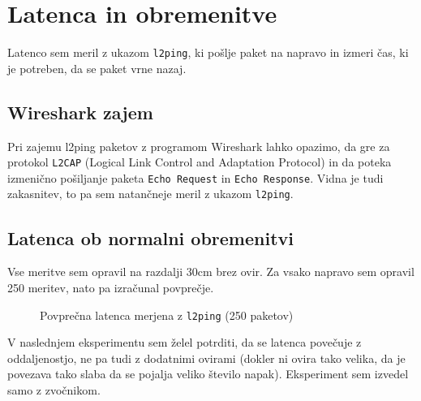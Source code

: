 \documentclass[11pt,a4paper,slovene]{article}
\begin{document}
\section{Latenca in obremenitve}

Latenco sem meril z ukazom \texttt{l2ping}, ki pošlje paket na napravo in izmeri čas, ki je potreben, da se paket vrne nazaj.

\subsection{Wireshark zajem}
Pri zajemu l2ping paketov z programom Wireshark lahko opazimo, da gre za protokol \texttt{L2CAP} (Logical Link Control and Adaptation Protocol) in da poteka izmenično pošiljanje paketa \texttt{Echo Request} in \texttt{Echo Response}. Vidna je tudi zakasnitev, to pa sem natančneje meril z ukazom \texttt{l2ping}.

\subsection{Latenca ob normalni obremenitvi}

Vse meritve sem opravil na razdalji 30cm brez ovir. Za vsako napravo sem opravil 250 meritev, nato pa izračunal povprečje.

\begin{figure}[H]
\centering
{}
\caption{Povprečna latenca merjena z \texttt{l2ping} (250 paketov)}
\end{figure}

V naslednjem eksperimentu sem želel potrditi, da se latenca povečuje z oddaljenostjo, ne pa tudi z dodatnimi ovirami (dokler ni ovira tako velika, da je povezava tako slaba da se pojalja veliko število napak). Eksperiment sem izvedel samo z zvočnikom.
\end{document}
